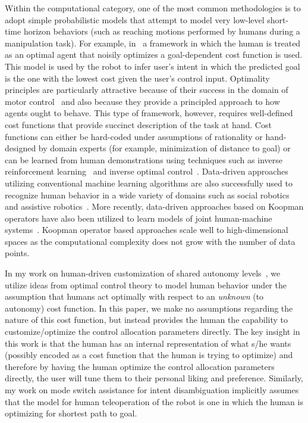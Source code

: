 \documentclass[12pt]{article}
\begin{document}
Within the computational category, one of the most common methodologies is to adopt simple probabilistic models that attempt to model very low-level short-time horizon behaviors (such as reaching motions performed by humans during a manipulation task). For example, in~\cite{dragan2013policy} a framework in which the human is treated as an optimal agent that noisily optimizes a goal-dependent cost function is used. This model is used by the robot to infer user's intent in which the predicted goal is the one with the lowest cost given the user's control input. Optimality principles are particularly attractive because of their success in the domain of motor control~\cite{uno1989formation} and also because they provide a principled approach to how agents ought to behave. This type of framework, however, requires well-defined cost functions that provide succinct description of the task at hand. Cost functions can either be hard-coded under assumptions of rationality or hand-designed by domain experts (for example, minimization of distance to goal) or can be learned from human demonstrations using techniques such as inverse reinforcement learning~\cite{ziebart2008maximum} and inverse optimal control~\cite{dvijotham2010inverse}.
Data-driven approaches utilizing conventional machine learning algorithms are also successfully used to recognize human behavior in a wide variety of domains such as social robotics~\cite{mataric2007socially} and assistive robotics~\cite{goil2013using}. More recently, data-driven approaches based on Koopman operators have also been utilized to learn models of joint human-machine systems~\cite{broad2018learning}. Koopman operator based approaches scale well to high-dimensional spaces as the computational complexity does not grow with the number of data points. 

In my work on human-driven customization of shared autonomy levels~\cite{gopinath2017human}, we utilize ideas from optimal control theory to model human behavior under the assumption that humans act optimally with respect to an \textit{unknown} (to autonomy) cost function. In this paper, we make no assumptions regarding the nature of this cost function, but instead provides the human the capability to customize/optimize the control allocation parameters directly. The key insight in this work is that the human has an internal representation of what s/he wants (possibly encoded as a cost function that the human is trying to optimize) and therefore by having the human optimize the control allocation parameters directly, the user will tune them to their personal liking and preference. Similarly, my work on mode switch assistance for intent disambiguation implicitly assumes that the model for human teleoperation of the robot is one in which the human is optimizing for shortest path to goal.
\end{document}
